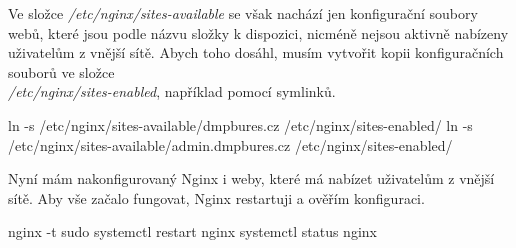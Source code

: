 \documentclass[12pt,a4paper]{report}
\begin{document}
  Ve složce \emph{/etc/nginx/sites-available} se však nachází jen konfigurační soubory webů,
  které jsou podle názvu složky k dispozici, nicméně nejsou aktivně nabízeny uživatelům z vnější sítě. 
  Abych toho dosáhl, musím vytvořit kopii konfiguračních souborů ve složce \\ \emph{/etc/nginx/sites-enabled}, například pomocí symlinků.

  \begin{bash}
    ln -s /etc/nginx/sites-available/dmpbures.cz 
    /etc/nginx/sites-enabled/
    ln -s /etc/nginx/sites-available/admin.dmpbures.cz
     /etc/nginx/sites-enabled/
  \end{bash}

  Nyní mám nakonfigurovaný Nginx i weby, které má nabízet uživatelům z vnější sítě.
  Aby vše začalo fungovat, Nginx restartuji a ověřím konfiguraci.
  \begin{bash}
    nginx -t
    sudo systemctl restart nginx
    systemctl status nginx
  \end{bash}
\end{document}
